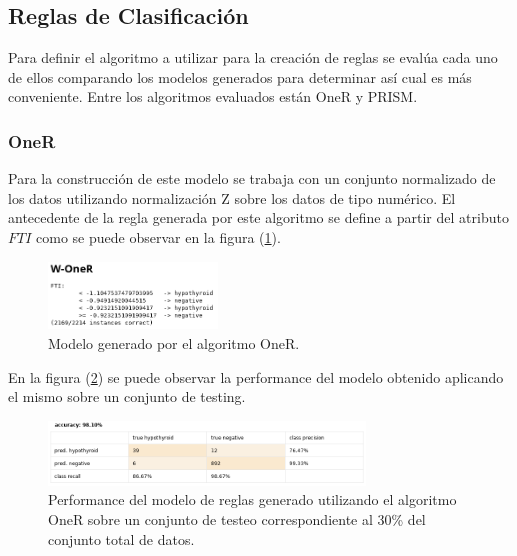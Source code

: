 \documentclass[osajnl,twocolumn,showpacs,superscriptaddress,10pt,floatfix]{revtex4-1} %
\begin{document}
\twocolumngrid

\subsection{Reglas de Clasificación}

Para definir el algoritmo a utilizar para la creación de reglas se evalúa cada uno de ellos comparando los modelos generados para determinar así cual es más conveniente. Entre los algoritmos evaluados están OneR y PRISM. \\

\subsubsection{OneR}

Para la construcción de este modelo se trabaja con un conjunto normalizado de los datos utilizando normalización Z sobre los datos de tipo numérico. El antecedente de la regla generada por este algoritmo se define a partir del atributo $FTI$ como se puede observar en la figura (\ref{figure:w_oneR}). \\

\begin{figure}[H]
    \centering
    \includegraphics[width=0.4\textwidth]{models/w_oneR}
    \caption{Modelo generado por el algoritmo OneR.}
    \label{figure:w_oneR}
\end{figure}

En la figura (\ref{figure:w_oneR_performance}) se puede observar la performance del modelo obtenido aplicando el mismo sobre un conjunto de testing. \\

\onecolumngrid

\begin{figure}[ht]
    \centering
    \includegraphics[width=0.75\textwidth]{models/w_oneR_performance}
    \caption{Performance del modelo de reglas generado utilizando el algoritmo OneR sobre un conjunto de testeo correspondiente al 30\% del conjunto total de datos.}
    \label{figure:w_oneR_performance}
\end{figure}
\end{document}
